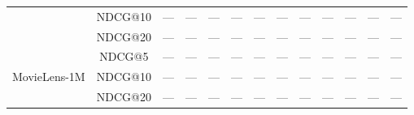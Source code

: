 \documentclass[master,english,final]{postech-ucs}
\begin{document}
\begin{table}[htbp]
{\begin{tabular}{cc|cccccccccc|c}
 & NDCG@10 & --- & --- & --- & --- & --- & --- & --- & --- & --- & --- & --- \\
 & NDCG@20 & --- & --- & --- & --- & --- & --- & --- & --- & --- & --- & --- \\
\midrule
\multirow{3}{*}{MovieLens-1M}
 & NDCG@5  & --- & --- & --- & --- & --- & --- & --- & --- & --- & --- & --- \\
 & NDCG@10 & --- & --- & --- & --- & --- & --- & --- & --- & --- & --- & --- \\
 & NDCG@20 & --- & --- & --- & --- & --- & --- & --- & --- & --- & --- & --- \\
\bottomrule
\end{tabular}
}
\end{table}

\begin{table}[htbp]
\caption{Governance and grounding comparison on the Amazon Clothing primary dataset. DCR: Directive Compliance Rate ($\uparrow$). TAS: Trend Alignment Score ($\uparrow$). IHR: Item Hallucination Rate ($\downarrow$). VDR: Vocabulary Drift Rate ($\downarrow$). SVR: Schema Violation Rate ($\downarrow$). Baselines that do not model directives/trends report ``n/a'' for the corresponding metric. Values to be populated upon completion of Phase E evaluation.}
\label{tab:governance_results}
\centering
{}
\end{table}
\end{document}
